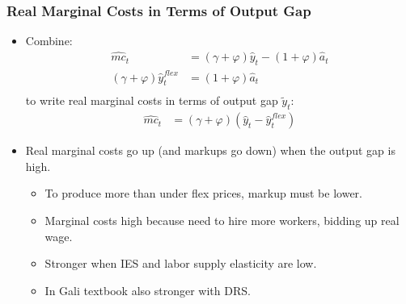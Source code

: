 \documentclass[english,xcolor=svgnames]{beamer}
\begin{document}
%
\begin{frame}
\frametitle{Real Marginal Costs in Terms of Output Gap
}
\begin{itemize}
	\item Combine:
	\begin{align*}
		\hat{mc}_t&=(\gamma+\varphi)\hat{y}_t-(1+\varphi)\hat{a}_t \\
		(\gamma+\varphi)\hat{y}_t^{flex}&=(1+\varphi)\hat{a}_t \\
\end{align*}
	to write real marginal costs in terms of output gap $\tilde{y}_t$:
	\begin{align*}
		\hat{mc}_t&=(\gamma+\varphi)(\hat{y}_t-\hat{y}_t^{flex})
	\end{align*}
	\item Real marginal costs go up (and markups go down) when the output gap is high.
	\begin{itemize}
		\item To produce more than under flex prices, markup must be lower.
		\item Marginal costs high because need to hire more workers,
bidding up real wage.
		\item Stronger when IES and labor supply elasticity are low.
		\item In Gali textbook also stronger with DRS.
	\end{itemize}
\end{itemize}
\end{frame}
\end{document}
